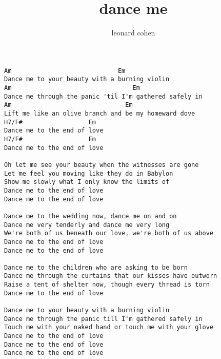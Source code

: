 \author{leonard cohen}
\title{dance me}
\maketitle
\begin{verbatim}
Am                             Em
Dance me to your beauty with a burning violin
Am                                 Em
Dance me through the panic 'til I'm gathered safely in
Am                               Em
Lift me like an olive branch and be my homeward dove
H7/F#                  Em
Dance me to the end of love
H7/F#                  Em
Dance me to the end of love

Oh let me see your beauty when the witnesses are gone
Let me feel you moving like they do in Babylon
Show me slowly what I only know the limits of
Dance me to the end of love
Dance me to the end of love

Dance me to the wedding now, dance me on and on
Dance me very tenderly and dance me very long
We're both of us beneath our love, we're both of us above
Dance me to the end of love
Dance me to the end of love

Dance me to the children who are asking to be born
Dance me through the curtains that our kisses have outworn
Raise a tent of shelter now, though every thread is torn
Dance me to the end of love

Dance me to your beauty with a burning violin
Dance me through the panic till I'm gathered safely in
Touch me with your naked hand or touch me with your glove
Dance me to the end of love
Dance me to the end of love
Dance me to the end of love
\end{verbatim}